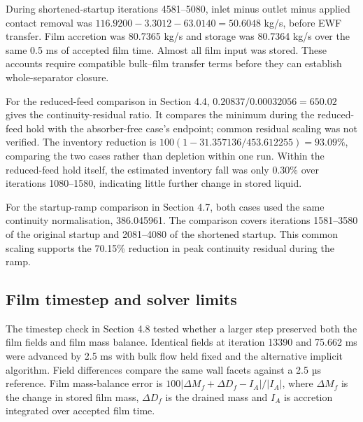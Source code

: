 \documentclass[12pt]{article}
\begin{document}
During shortened-startup iterations 4581--5080, inlet minus outlet minus applied contact removal was \(116.9200-3.3012-63.0140=50.6048\) kg/s, before EWF transfer. Film accretion was 80.7365 kg/s and storage was 80.7364 kg/s over the same 0.5 ms of accepted film time. Almost all film input was stored. These accounts require compatible bulk--film transfer terms before they can establish whole-separator closure.

For the reduced-feed comparison in Section 4.4, \(0.20837/0.00032056=650.02\) gives the continuity-residual ratio. It compares the minimum during the reduced-feed hold with the absorber-free case's endpoint; common residual scaling was not verified. The inventory reduction is \(100(1-31.357136/453.612255)=93.09\%\), comparing the two cases rather than depletion within one run. Within the reduced-feed hold itself, the estimated inventory fall was only 0.30\% over iterations 1080--1580, indicating little further change in stored liquid.

For the startup-ramp comparison in Section 4.7, both cases used the same continuity normalisation, 386.045961. The comparison covers iterations 1581--3580 of the original startup and 2081--4080 of the shortened startup. This common scaling supports the 70.15\% reduction in peak continuity residual during the ramp.

\subsection{Film timestep and solver limits}\label{a.4.-film-timestep-and-solver-limits}

The timestep check in Section 4.8 tested whether a larger step preserved both the film fields and film mass balance. Identical fields at iteration 13390 and 75.662 ms were advanced by 2.5 ms with bulk flow held fixed and the alternative implicit algorithm. Field differences compare the same wall facets against a 2.5 µs reference. Film mass-balance error is \(100|\Delta M_f+\Delta D_f-I_A|/|I_A|\), where \(\Delta M_f\) is the change in stored film mass, \(\Delta D_f\) is the drained mass and \(I_A\) is accretion integrated over accepted film time.
\end{document}
